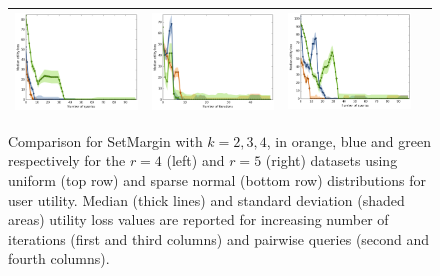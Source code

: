 \documentclass{article}
\renewcommand\[{\begin{equation}}
\renewcommand\]{\end{equation}}
\begin{document}
\begin{figure}[b]
{\begin{tabular}{cccc}
        \includegraphics[width=10em]{figures/synthetic_vs_self_4_normal_sparse_per_query_loss} &
        \includegraphics[width=10em]{figures/synthetic_vs_self_5_normal_sparse_per_iter_loss} &
        \includegraphics[width=10em]{figures/synthetic_vs_self_5_normal_sparse_per_query_loss}
        \\
        \hline
     \end{tabular}
    }
    \caption{\label{fig:selfcomparison} Comparison for {\sc SetMargin}
      with $k=2,3,4$, in orange, blue and green respectively for the
      $r=4$ (left) and $r=5$ (right) datasets using uniform (top row) and sparse normal (bottom row) distributions for user utility. Median (thick lines) and standard deviation (shaded areas) utility loss values are reported for increasing number of iterations (first and third columns) and pairwise queries (second and fourth columns).}
\end{figure}

\end{document}
